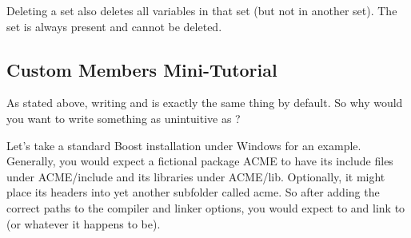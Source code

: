 Deleting a set also deletes all variables in that set (but not in another set). The  set is always present and cannot be deleted.

\subsection{Custom Members Mini-Tutorial}\label{sec:mini_tutorial}

As stated above, writing  and  is exactly the same thing by default. So why would you want to write something as unintuitive as ?

Let's take a standard Boost installation under Windows for an example. Generally, you would expect a fictional package ACME to have its include files under ACME/include and its libraries under ACME/lib. Optionally, it might place its headers into yet another subfolder called acme. So after adding the correct paths to the compiler and linker options, you would expect to  and link to  (or whatever it happens to be).

%
